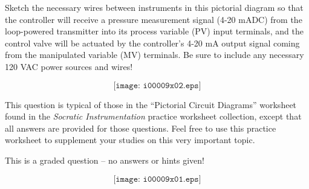 

Sketch the necessary wires between instruments in this pictorial diagram so that the controller will receive a pressure measurement signal (4-20 mADC) from the loop-powered transmitter into its process variable (PV) input terminals, and the control valve will be actuated by the controller's 4-20 mA output signal coming from the manipulated variable (MV) terminals.  Be sure to include any necessary 120 VAC power sources and wires!

$$\texttt{[image: i00009x02.eps]}$$


\vfil

This question is typical of those in the ``Pictorial Circuit Diagrams'' worksheet found in the {\it Socratic Instrumentation} practice worksheet collection, except that all answers are provided for those questions.  Feel free to use this practice worksheet to supplement your studies on this very important topic.

\eject






This is a graded question -- no answers or hints given!







$$\texttt{[image: i00009x01.eps]}$$




